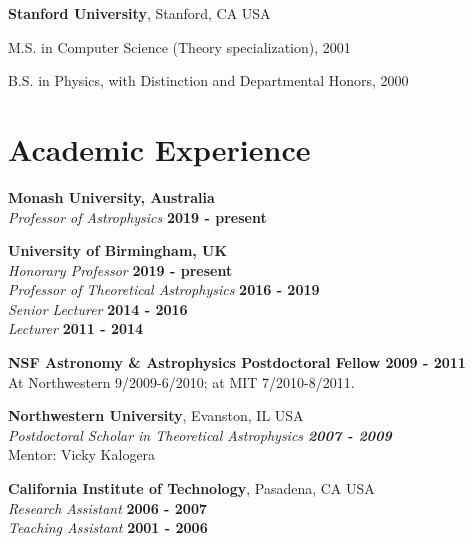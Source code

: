 \documentclass[margin,line]{res}
\newenvironment{list1}{
  \begin{list}{\ding{113}}{%
      \setlength{\itemsep}{0in}
      \setlength{\parsep}{0in} \setlength{\parskip}{0in}
      \setlength{\topsep}{0in} \setlength{\partopsep}{0in} 
      \setlength{\leftmargin}{0.17in}}}{\end{list}}
\begin{document}
\begin{resume}
{\bf Stanford University}, Stanford, CA USA\\
\vspace*{-.1in}
\begin{list1}
\item[] M.S. in Computer Science (Theory specialization), 2001
\vspace*{.05in}
\item[] B.S. in Physics, with Distinction and Departmental Honors, 2000 
\end{list1}


\section{\sc Academic Experience}

{\bf Monash University, Australia}\\
{\em Professor of Astrophysics}  \hfill {\bf 2019 - present}

{\bf University of Birmingham, UK}\\
{\em Honorary Professor}  \hfill {\bf 2019 - present}\\
{\em Professor of Theoretical Astrophysics} \hfill {\bf 2016 - 2019}\\
{\em Senior Lecturer} \hfill {\bf 2014 - 2016}\\
{\em Lecturer} \hfill {\bf 2011 - 2014}

{\bf NSF Astronomy \& Astrophysics Postdoctoral Fellow \hfill {2009 - 2011}}\\
At Northwestern 9/2009-6/2010; at MIT 7/2010-8/2011.
 
{\bf Northwestern University}, Evanston, IL USA\\
\vspace*{.02in}
{\em Postdoctoral Scholar in Theoretical Astrophysics  \hfill {\bf 2007 - 2009}}\\
Mentor: Vicky Kalogera

{\bf California Institute of Technology}, Pasadena, CA USA\\
\vspace*{.02in}
{\em Research Assistant} \hfill {\bf 2006 - 2007}\\
\vspace*{0.02in}
 {\em Teaching Assistant} \hfill {\bf 2001 - 2006}


\end{resume}
\end{document}
